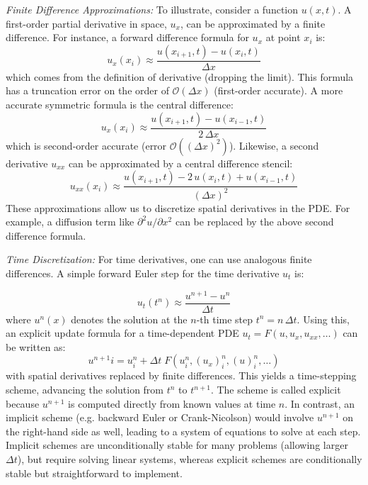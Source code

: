 \documentclass{adonis}
\begin{document}
\textit{Finite Difference Approximations:} To illustrate, consider a function $u(x,t)$. A first-order partial derivative in space, $u_x$, can be approximated by a finite difference. For instance, a forward difference formula for $u_x$ at point $x_i$ is:
$$ 
u_x(x_i) \approx \frac{u(x_{i+1},t) - u(x_i,t)}{\Delta x}
$$ 
which comes from the definition of derivative (dropping the limit). This formula has a truncation error on the order of $\mathcal{O}(\Delta x)$ (first-order accurate). A more accurate symmetric formula is the central difference:
$$
u_x(x_i) \approx \frac{u(x_{i+1},t) - u(x_{i-1},t)}{2\,\Delta x}
$$ 
which is second-order accurate (error $\mathcal{O}((\Delta x)^2)$). Likewise, a second derivative $u_{xx}$ can be approximated by a central difference stencil:
$$ 
u_{xx}(x_i) \approx \frac{u(x_{i+1},t) - 2\,u(x_i,t) + u(x_{i-1},t)}{(\Delta x)^2} 
$$
These approximations allow us to discretize spatial derivatives in the PDE. For example, a diffusion term like $\partial^2 u/\partial x^2$ can be replaced by the above second difference formula. 

\textit{Time Discretization:} For time derivatives, one can use analogous finite differences. A simple forward Euler step for the time derivative $u_t$ is:

$$ 
u_t(t^n) \approx \frac{u^{n+1} - u^n}{\Delta t}
$$
where $u^n(x)$ denotes the solution at the $n$-th time step $t^n = n\,\Delta t$. Using this, an explicit update formula for a time-dependent PDE $u_t = F(u,u_x,u_{xx},\dots)$ can be written as:
$$ 
u^{n+1}i = u^n_i + \Delta t \; F(u^n_i, (u_x)^n_i, (u)^n_i,\dots)
$$
with spatial derivatives replaced by finite differences. This yields a time-stepping scheme, advancing the solution from $t^n$ to $t^{n+1}$. The scheme is called explicit because $u^{n+1}$ is computed directly from known values at time $n$. In contrast, an implicit scheme (e.g. backward Euler or Crank-Nicolson) would involve $u^{n+1}$ on the right-hand side as well, leading to a system of equations to solve at each step. Implicit schemes are unconditionally stable for many problems (allowing larger $ \Delta t$), but require solving linear systems, whereas explicit schemes are conditionally stable but straightforward to implement. 
\end{document}
